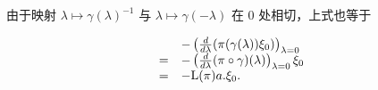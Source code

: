 由于映射 \(\lambda \mapsto \gamma (\lambda)^{-1}\) 与 \(\lambda \mapsto \gamma (-\lambda)\) 在 0 处相切，上式也等于

\[
\begin{array}{r l} & {- \left(\frac {d}{d \lambda} (\pi (\gamma (\lambda)) \xi_ {0})\right) _ {\lambda = 0}} \\ {=} & {- \left(\frac {d}{d \lambda} (\pi \circ \gamma) (\lambda)\right) _ {\lambda = 0} \xi_ {0}} \\ {=} & {- \mathrm{L} (\pi) a. \xi_ {0}.} \end{array}
\]
\relax{}
